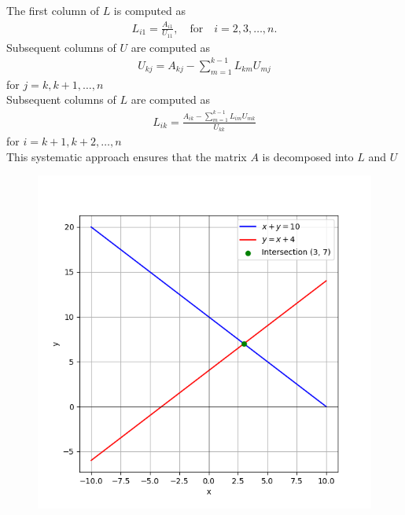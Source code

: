 \documentclass[journal]{IEEEtran}
\numberwithin{equation}{enumi}
\numberwithin{figure}{enumi}
\begin{document}
The first column of $L$ is computed as
\begin{align}
    L_{i1} = \frac{A_{i1}}{U_{11}}, \quad \text{for} \quad i = 2, 3, \dots, n.
\end{align}
Subsequent columns of $U$ are computed as 
\begin{align}
    U_{kj} = A_{kj} - \sum_{m=1}^{k-1} L_{km} U_{mj}
\end{align}
for $j = k, k+1, \dots, n$\\
Subsequent columns of $L$ are computed as
\begin{align}
    L_{ik} = \frac{A_{ik} - \sum_{m=1}^{k-1} L_{im} U_{mk}}{U_{kk}}
\end{align}
for $i= k+1, k+2, \dots, n$ \\
This systematic approach ensures that the matrix \( A \) is decomposed into \( L \) and \( U \) 
\begin{figure}[h!]
	\centering
	\includegraphics[width=\columnwidth]{figs/Figure_1.png}
	\label{stemplot}
\end{figure}
\end{document}
